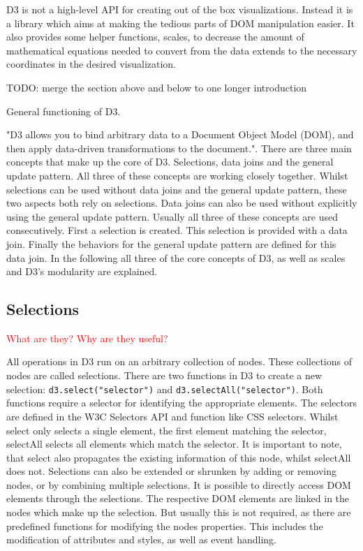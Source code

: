 D3 is not a high-level API for creating out of the box visualizations. Instead it is a library which aims at making the tedious parts of DOM manipulation easier. It also provides some helper functions, scales, to decrease the amount of mathematical equations needed to convert from the data extends to the necessary coordinates in the desired visualization.

TODO: merge the section above and below to one longer introduction

General functioning of D3.

"D3 allows you to bind arbitrary data to a Document Object Model (DOM), and then apply data-driven transformations to the document."\cite{d3js}. There are three main concepts that make up the core of D3. Selections, data joins and the general update pattern. All three of these concepts are working closely together. Whilst selections can be used without data joins and the general update pattern, these two aspects both rely on selections. Data joins can also be used without explicitly using the general update pattern. Usually all three of these concepts are used consecutively. First a selection is created. This selection is provided with a data join. Finally the behaviors for the general update pattern are defined for this data join.
In the following all three of the core concepts of D3, as well as scales and D3's modularity are explained.

\subsection{Selections}
\textcolor{red}{
What are they? Why are they useful?}

All operations in D3 run on an arbitrary collection of nodes. These collections of nodes are called selections. There are two functions in D3 to create a new selection: \verb|d3.select("selector")| and \verb|d3.selectAll("selector")|. Both functions require a selector for identifying the appropriate elements. The selectors are defined in the W3C Selectors API\cite{w3c_selectors_api} and function like CSS selectors. Whilst select only selects a single element, the first element matching the selector, selectAll selects all elements which match the selector. It is important to note, that select also propagates the existing information of this node, whilst selectAll does not.
Selections can also be extended or shrunken by adding or removing nodes, or by combining multiple selections.
It is possible to directly access DOM elements through the selections. The respective DOM elements are linked in the nodes which make up the selection. But usually this is not required, as there are predefined functions for modifying the nodes properties. This includes the modification of attributes and styles, as well as event handling. 


